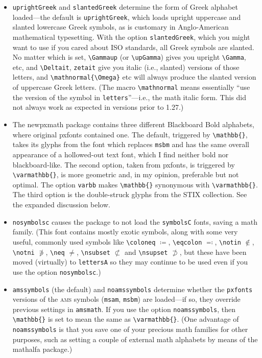 \documentclass[11pt]{article}
\theoremstyle{oldplain}
\theoremstyle{plain}
\begin{document}
\begin{itemize}
\item {\tt uprightGreek} and {\tt slantedGreek} determine the form of Greek alphabet loaded---the default is {\tt uprightGreek}, which loads upright uppercase and slanted lowercase Greek symbols, as is customary in Anglo-American mathematical typesetting. With the option {\tt slantedGreek}, which you might want to use if you cared about ISO standards, all Greek symbols are slanted. No matter which is set, \verb|\Gammaup| (or \verb|\upGamma|) gives you upright \verb|\Gamma|, etc, and \verb|\Deltait|, \verb|zetait| give you italic (i.e., slanted) versions of those letters, and \verb|\mathnormal{\Omega}| etc will always produce the slanted version of uppercase Greek letters. (The macro \verb|\mathnormal| means essentially ``use the version of the symbol in {\tt letters}''---i.e., the math italic form. This did not always work as expected in versions prior to 1.27.)
\item The \textsf{newpxmath} package contains three different Blackboard Bold alphabets, where original \textsf{pxfonts} contained one. The default, triggered by \verb|\mathbb{}|, takes its glyphs from the font which replaces {\tt msbm} and has the same overall appearance of a hollowed-out text font, which I find neither bold nor blackboard-like. The second option, taken from \textsf{pxfonts}, is triggered by \verb|\varmathbb{}|, is more geometric and, in my opinion, preferable but not optimal. The option {\tt varbb} makes \verb|\mathbb{}| synonymous with \verb|\varmathbb{}|. The third option is the double-struck glyphs from the STIX collection. See the expanded discussion below.
\item {\tt nosymbolsc} causes the package to not load the {\tt symbolsC} fonts, saving  a math family. (This font contains mostly exotic symbols, along with some very useful, commonly used symbols like \verb|\coloneq| $\coloneq$, \verb|\eqcolon| $\eqcolon$, \verb|\notin| $\notin$, \verb|\notni| $\notni$, \verb|\neq| $\neq$, \verb|\nsubset| $\nsubset$ and \verb|\nsupset| $\nsupset$, but these have been moved (virtually) to {\tt lettersA} so they may continue to be used even if you use the option {\tt nosymbolsc}.)
\item {\tt amssymbols} (the default) and {\tt noamssymbols} determine whether the {\tt pxfonts} versions of the \textsc{ams} symbols ({\tt msam}, {\tt msbm}) are loaded---if so, they override previous settings in {\tt amsmath}. If you use the option {\tt noamssymbols}, then \verb|\mathbb{}| is set to mean the same as \verb|\varmathbb{}|. (One advantage of {\tt noamssymbols} is that you save one of your precious math families for other purposes, such as setting a couple of external math alphabets by means of the \textsf{mathalfa} package.)
\end{itemize}
\end{document}
